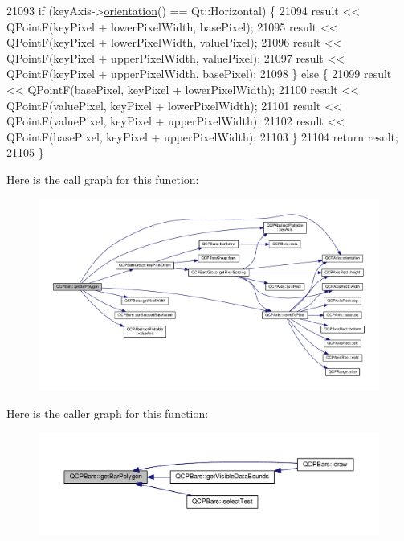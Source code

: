 \begin{DoxyCode}
21093   \textcolor{keywordflow}{if} (keyAxis->\hyperlink{class_q_c_p_axis_a57483f2f60145ddc9e63f3af53959265}{orientation}() == Qt::Horizontal) \{
21094     result << QPointF(keyPixel + lowerPixelWidth, basePixel);
21095     result << QPointF(keyPixel + lowerPixelWidth, valuePixel);
21096     result << QPointF(keyPixel + upperPixelWidth, valuePixel);
21097     result << QPointF(keyPixel + upperPixelWidth, basePixel);
21098   \} \textcolor{keywordflow}{else} \{
21099     result << QPointF(basePixel, keyPixel + lowerPixelWidth);
21100     result << QPointF(valuePixel, keyPixel + lowerPixelWidth);
21101     result << QPointF(valuePixel, keyPixel + upperPixelWidth);
21102     result << QPointF(basePixel, keyPixel + upperPixelWidth);
21103   \}
21104   \textcolor{keywordflow}{return} result;
21105 \}
\end{DoxyCode}


Here is the call graph for this function\+:\nopagebreak
\begin{figure}[H]
\begin{center}
\leavevmode
\includegraphics[width=350pt]{class_q_c_p_bars_a1d118a76662cfd691a78c6f573e3f78c_cgraph}
\end{center}
\end{figure}




Here is the caller graph for this function\+:\nopagebreak
\begin{figure}[H]
\begin{center}
\leavevmode
\includegraphics[width=350pt]{class_q_c_p_bars_a1d118a76662cfd691a78c6f573e3f78c_icgraph}
\end{center}
\end{figure}


